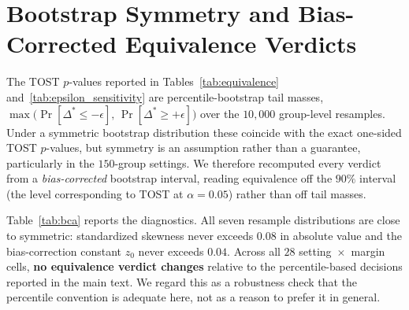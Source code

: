 \documentclass{article}
\begin{document}
\section{Bootstrap Symmetry and Bias-Corrected Equivalence Verdicts}
\label{app:bca}

The TOST $p$-values reported in Tables~\ref{tab:equivalence} and~\ref{tab:epsilon_sensitivity} are percentile-bootstrap tail masses, $\max\!\big(\Pr[\Delta^{*}\le-\epsilon],\,\Pr[\Delta^{*}\ge+\epsilon]\big)$ over the $10{,}000$ group-level resamples. Under a symmetric bootstrap distribution these coincide with the exact one-sided TOST $p$-values, but symmetry is an assumption rather than a guarantee, particularly in the $150$-group settings. We therefore recomputed every verdict from a \emph{bias-corrected} bootstrap interval, reading equivalence off the $90\%$ interval (the level corresponding to TOST at $\alpha=0.05$) rather than off tail masses.

Table~\ref{tab:bca} reports the diagnostics. All seven resample distributions are close to symmetric: standardized skewness never exceeds $0.08$ in absolute value and the bias-correction constant $z_0$ never exceeds $0.04$. Across all $28$ setting~$\times$~margin cells, \textbf{no equivalence verdict changes} relative to the percentile-based decisions reported in the main text. We regard this as a robustness check that the percentile convention is adequate here, not as a reason to prefer it in general.
\end{document}
